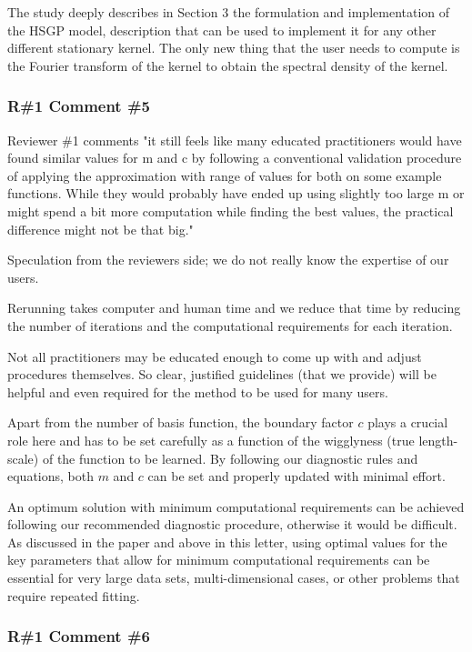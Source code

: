 \documentclass[11pt]{report}
\begin{document}
The study deeply describes in Section 3 the formulation and implementation of the HSGP model, description that can be used to implement it for any other different stationary kernel. The only new thing that the user needs to compute is the Fourier transform of the kernel to obtain the spectral density of the kernel.

\subsubsection*{R\#1 Comment \#5}

Reviewer \#1 comments "it still feels like many educated practitioners would have found similar values for m and c by following a conventional validation procedure of applying the approximation with range of values for both on some example functions. While they would probably have ended up using slightly too large m or might spend a bit more computation while finding the best values, the practical difference might not be that big."

Speculation from the reviewers side; we do not really know the expertise of our users. 

Rerunning takes computer and human time and we reduce that time by reducing the number of iterations and the computational requirements for each iteration. 

Not all practitioners may be educated enough to come up with and adjust procedures themselves. So clear, justified guidelines (that we provide) will be helpful and even required for the method to be used for many users.

Apart from the number of basis function, the boundary factor $c$ plays a crucial role here and has to be set carefully as a function of the wigglyness (true length-scale) of the function to be learned. By following our diagnostic rules and equations, both $m$ and $c$ can be set and properly updated with minimal effort.

An optimum solution with minimum computational requirements can be achieved following our recommended diagnostic procedure, otherwise it would be difficult. As discussed in the paper and above in this letter, using optimal values for the key parameters that allow for minimum computational requirements can be essential for very large data sets, multi-dimensional cases, or other problems that require repeated fitting.

\subsubsection*{R\#1 Comment \#6}
\end{document}
